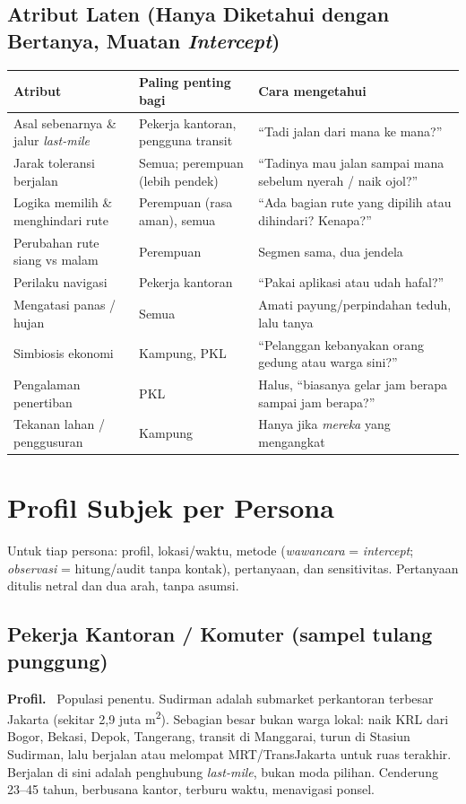 \documentclass[11pt,a4paper]{report}
\newcommand{\fld}[1]{\smallskip\noindent\textbf{#1.}\ }
\begin{document}
\section{Atribut Laten (Hanya Diketahui dengan Bertanya, Muatan \emph{Intercept})}
\begin{longtable}{@{}p{4.2cm}p{4.0cm}p{5.0cm}@{}}
\toprule
\textbf{Atribut} & \textbf{Paling penting bagi} & \textbf{Cara mengetahui} \\
\midrule
\endhead
Asal sebenarnya \& jalur \emph{last-mile} & Pekerja kantoran, pengguna transit & ``Tadi jalan dari mana ke mana?'' \\
Jarak toleransi berjalan & Semua; perempuan (lebih pendek) & ``Tadinya mau jalan sampai mana sebelum nyerah / naik ojol?'' \\
Logika memilih \& menghindari rute & Perempuan (rasa aman), semua & ``Ada bagian rute yang dipilih atau dihindari? Kenapa?'' \\
Perubahan rute siang vs malam & Perempuan & Segmen sama, dua jendela \\
Perilaku navigasi & Pekerja kantoran & ``Pakai aplikasi atau udah hafal?'' \\
Mengatasi panas / hujan & Semua & Amati payung/perpindahan teduh, lalu tanya \\
Simbiosis ekonomi & Kampung, PKL & ``Pelanggan kebanyakan orang gedung atau warga sini?'' \\
Pengalaman penertiban & PKL & Halus, ``biasanya gelar jam berapa sampai jam berapa?'' \\
Tekanan lahan / penggusuran & Kampung & Hanya jika \emph{mereka} yang mengangkat \\
\bottomrule
\end{longtable}

\chapter{Profil Subjek per Persona}

Untuk tiap persona: profil, lokasi/waktu, metode (\emph{wawancara} = \emph{intercept};
\emph{observasi} = hitung/audit tanpa kontak), pertanyaan, dan sensitivitas.
Pertanyaan ditulis netral dan dua arah, tanpa asumsi.

\section{Pekerja Kantoran / Komuter \textnormal{(sampel tulang punggung)}}
\fld{Profil} Populasi penentu. Sudirman adalah submarket perkantoran terbesar Jakarta
(sekitar 2,9 juta m\textsuperscript{2}). Sebagian besar bukan warga lokal: naik KRL dari
Bogor, Bekasi, Depok, Tangerang, transit di Manggarai, turun di Stasiun Sudirman, lalu
berjalan atau melompat MRT/TransJakarta untuk ruas terakhir. Berjalan di sini adalah
penghubung \emph{last-mile}, bukan moda pilihan. Cenderung 23--45 tahun, berbusana
kantor, terburu waktu, menavigasi ponsel.
\end{document}
